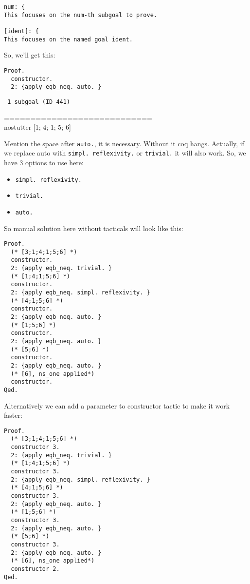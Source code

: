 \documentclass[12pt]{article}
\newcommand{\codeBlock}[1]{\colorbox{cverbbg}{\parbox{0.85\textwidth}{#1}}}
\begin{document}
\begin{verbatim}
num: {
This focuses on the num-th subgoal to prove.

[ident]: {
This focuses on the named goal ident.
\end{verbatim}

So, we'll get this:

\begin{verbatim}
Proof.
  constructor.
  2: {apply eqb_neq. auto. }
\end{verbatim}

\noindent
\begin{minipage}[t]{.45\textwidth}
\codeBlock{{\tt
1 subgoal (ID 441)

============================\\
nostutter [1; 4; 1; 5; 6]
}}
\end{minipage}

\vspace{2em}
Mention the space after {\tt auto.}, it is necessary. Without it coq hangs. Actually, if we replace auto with {\tt simpl. reflexivity.} or {\tt trivial.} it will also work. So, we have 3 options to use here:

\begin{itemize}
\item {\tt simpl. reflexivity.}
\item {\tt trivial.}
\item {\tt auto.}
\end{itemize}

So manual solution here without tacticals will look like this:

\begin{verbatim}
Proof.
  (* [3;1;4;1;5;6] *)
  constructor.
  2: {apply eqb_neq. trivial. }
  (* [1;4;1;5;6] *)
  constructor.
  2: {apply eqb_neq. simpl. reflexivity. }
  (* [4;1;5;6] *)
  constructor.
  2: {apply eqb_neq. auto. }
  (* [1;5;6] *)
  constructor.
  2: {apply eqb_neq. auto. }
  (* [5;6] *)
  constructor.
  2: {apply eqb_neq. auto. }
  (* [6], ns_one applied*)
  constructor.
Qed.
\end{verbatim}

Alternatively we can add a parameter to constructor tactic to make it work faster:

\begin{verbatim}
Proof.
  (* [3;1;4;1;5;6] *)
  constructor 3.
  2: {apply eqb_neq. trivial. }
  (* [1;4;1;5;6] *)
  constructor 3.
  2: {apply eqb_neq. simpl. reflexivity. }
  (* [4;1;5;6] *)
  constructor 3.
  2: {apply eqb_neq. auto. }
  (* [1;5;6] *)
  constructor 3.
  2: {apply eqb_neq. auto. }
  (* [5;6] *)
  constructor 3.
  2: {apply eqb_neq. auto. }
  (* [6], ns_one applied*)
  constructor 2.
Qed.
\end{verbatim}
\end{document}
